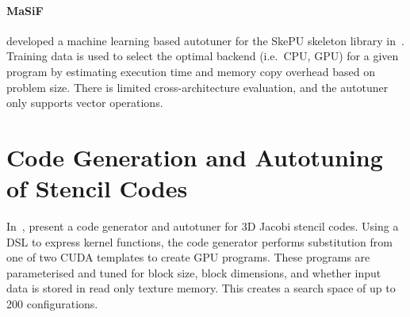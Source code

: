 %
\paragraph{MaSiF} 


\citeauthor{Dastgeer2011} developed a machine learning based autotuner
for the SkePU skeleton library in~\cite{Dastgeer2011}. Training data
is used to select the optimal backend (i.e.\ CPU, GPU) for a given
program by estimating execution time and memory copy overhead based on
problem size. There is limited cross-architecture evaluation, and the
autotuner only supports vector operations.



\section{Code Generation and Autotuning of Stencil Codes}

In~\cite{Zhang2013a}, \citeauthor{Zhang2013a} present a code generator
and autotuner for 3D Jacobi stencil codes. Using a DSL to express
kernel functions, the code generator performs substitution from one of
two CUDA templates to create GPU programs. These programs are
parameterised and tuned for block size, block dimensions, and whether
input data is stored in read only texture memory. This creates a
search space of up to 200 configurations.

